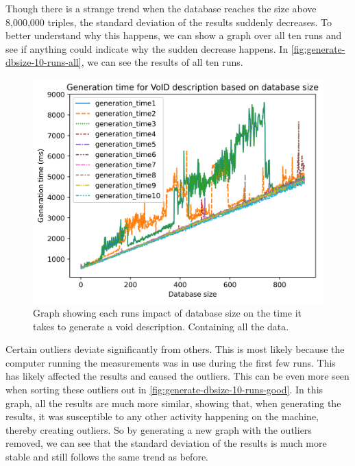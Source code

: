 Though there is a strange trend when the database reaches the size above 8,000,000 triples, the standard deviation of the results suddenly decreases. To better understand why this happens, we can show a graph over all ten runs and see if anything could indicate why the sudden decrease happens. In \autoref{fig:generate-dbsize-10-runs-all}, we can see the results of all ten runs.

\begin{figure}[htb!]
    \centering
    \includegraphics[width=0.8\columnwidth]{figures/generation-results-graph-all.png}
    \caption{Graph showing each runs impact of database size on the time it takes to generate a \gls{void} description. Containing all the data.}
    \label{fig:generate-dbsize-10-runs-all}
\end{figure}

Certain outliers deviate significantly from others. This is most likely because the computer running the measurements was in use during the first few runs. This has likely affected the results and caused the outliers. This can be even more seen when sorting these outliers out in \autoref{fig:generate-dbsize-10-runs-good}. In this graph, all the results are much more similar, showing that, when generating the results, it was susceptible to any other activity happening on the machine, thereby creating outliers. So by generating a new graph with the outliers removed, we can see that the standard deviation of the results is much more stable and still follows the same trend as before.

